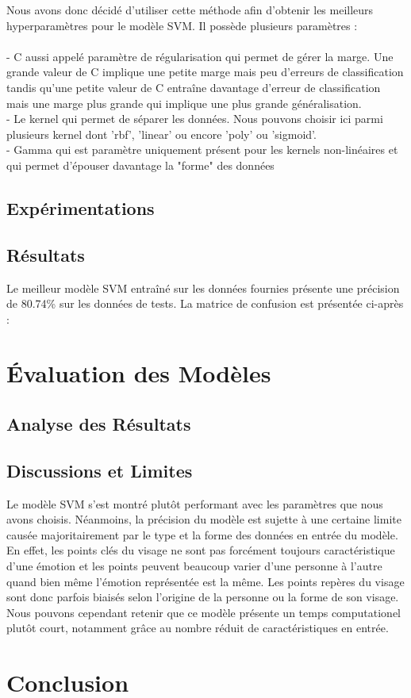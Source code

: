 \documentclass{rapport}
\begin{document}
Nous avons donc décidé d'utiliser cette méthode afin d'obtenir les meilleurs hyperparamètres pour le modèle SVM. Il possède plusieurs paramètres :\\
\\- C aussi appelé paramètre de régularisation qui permet de gérer la marge. Une grande valeur de C implique une petite marge mais peu d'erreurs de classification
tandis qu'une petite valeur de C entraîne davantage d'erreur de classification mais une marge plus grande qui implique une plus grande généralisation.\\
- Le kernel qui permet de séparer les données. Nous pouvons choisir ici parmi plusieurs kernel dont 'rbf', 'linear' ou encore
'poly' ou 'sigmoid'.\\
- Gamma qui est paramètre uniquement présent pour les kernels non-linéaires et qui permet d'épouser davantage la "forme" des données
\subsection{Expérimentations}
\subsection{Résultats}

Le meilleur modèle SVM entraîné sur les données fournies présente une précision de 80.74\% sur les données de tests. La matrice de confusion est présentée ci-après :


\section{Évaluation des Modèles}
\subsection{Analyse des Résultats}

\subsection{Discussions et Limites}

Le modèle SVM s'est montré plutôt performant avec les paramètres que nous avons choisis. Néanmoins, la précision du modèle est sujette à une certaine limite causée
majoritairement par le type et la forme des données en entrée du modèle. En effet, les points clés du visage ne sont pas forcément toujours caractéristique d'une émotion
et les points peuvent beaucoup varier d'une personne à l'autre quand bien même l'émotion représentée est la même. Les points repères du visage sont donc parfois biaisés selon
l'origine de la personne ou la forme de son visage. Nous pouvons cependant retenir que ce modèle présente un temps computationel plutôt court, notamment grâce au nombre réduit
de caractéristiques en entrée.

\section{Conclusion}



\end{document}
